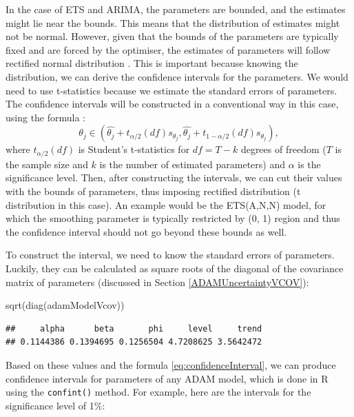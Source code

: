 \documentclass[
]{book}
\newenvironment{Shaded}{\begin{snugshade}}{\end{snugshade}}
\newcommand{\FunctionTok}[1]{\textcolor[rgb]{0.00,0.00,0.00}{#1}}
\newcommand{\NormalTok}[1]{#1}
\theoremstyle{definition}
\theoremstyle{definition}
\theoremstyle{definition}
\theoremstyle{definition}
\theoremstyle{remark}
\begin{document}
In the case of ETS and ARIMA, the parameters are bounded, and the estimates might lie near the bounds. This means that the distribution of estimates might not be normal. However, given that the bounds of the parameters are typically fixed and are forced by the optimiser, the estimates of parameters will follow rectified normal distribution \citep{WikipediaRectifiedNormal}. This is important because knowing the distribution, we can derive the confidence intervals for the parameters. We would need to use t-statistics because we estimate the standard errors of parameters. The confidence intervals will be constructed in a conventional way in this case, using the formula \citep[see Section 5.1 of][]{SvetunkovSBA}:
\begin{equation}
    \theta_j \in (\hat{\theta_j} + t_{\alpha/2}(df) s_{\theta_j}, \hat{\theta_j} + t_{1-\alpha/2}(df) s_{\theta_j}), 
    \label{eq:confidenceInterval}
\end{equation}
where \(t_{\alpha/2}(df)\) is Student's t-statistics for \(df=T-k\) degrees of freedom (\(T\) is the sample size and \(k\) is the number of estimated parameters) and \(\alpha\) is the significance level. Then, after constructing the intervals, we can cut their values with the bounds of parameters, thus imposing rectified distribution (t distribution in this case). An example would be the ETS(A,N,N) model, for which the smoothing parameter is typically restricted by (0, 1) region and thus the confidence interval should not go beyond these bounds as well.

To construct the interval, we need to know the standard errors of parameters. Luckily, they can be calculated as square roots of the diagonal of the covariance matrix of parameters (discussed in Section \ref{ADAMUncertaintyVCOV}):

\begin{Shaded}
\begin{Highlighting}[]
\FunctionTok{sqrt}\NormalTok{(}\FunctionTok{diag}\NormalTok{(adamModelVcov))}
\end{Highlighting}
\end{Shaded}

\begin{verbatim}
##     alpha      beta       phi     level     trend 
## 0.1144386 0.1394695 0.1256504 4.7208625 3.5642472
\end{verbatim}

Based on these values and the formula \eqref{eq:confidenceInterval}, we can produce confidence intervals for parameters of any ADAM model, which is done in R using the \texttt{confint()} method. For example, here are the intervals for the significance level of 1\%:
\end{document}
